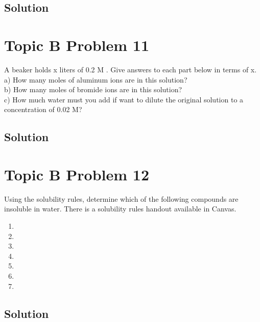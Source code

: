 \documentclass[10pt]{article}
\begin{document}
        \subsection{Solution}

    \pagebreak
    \section{Topic B Problem 11}
        A beaker holds x liters of 0.2 M . 
        Give answers to each part below in terms of x.\\
        a) How many moles of aluminum ions are in this solution?\\
        b) How many moles of bromide ions are in this solution?\\
        c) How much water must you add if want to dilute the original solution to a concentration of 0.02 M?

        \subsection{Solution}

    \pagebreak
    \section{Topic B Problem 12}
        Using the solubility rules, determine which of the following compounds are insoluble in water. 
        There is a solubility rules handout available in Canvas.
        \begin{multicols}{3}
            \begin{enumerate}[label=\alph*)]
                \item   {} 
                \item   {}
                \item   {}
                \item   {}
                \item   {}
                \item   {}
                \item   {}
            \end{enumerate}
        \end{multicols}

        \subsection{Solution}

    \pagebreak
    \tableofcontents
\end{document}
